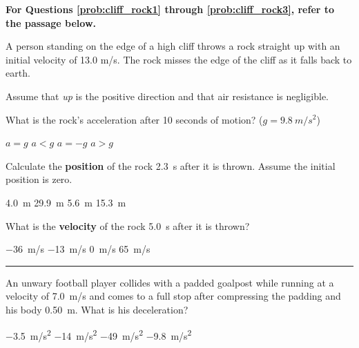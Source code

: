 \documentclass[addpoints]{exam}
\begin{document}
\begin{questions}
\clearpage
\begin{EnvUplevel}
\textbf{For Questions \ref{prob:cliff_rock1} through \ref{prob:cliff_rock3}, refer to the passage below.}

A person standing on the edge of a high cliff throws a rock straight up with an initial velocity of 13.0 m/s. The rock misses the edge of the cliff as it falls back to earth.

Assume that \textit{up} is the positive direction and that air resistance is negligible.
\end{EnvUplevel}%

\question \label{prob:cliff_rock1}
What is the rock's acceleration after 10 seconds of motion? ($g = \SI{9.8}{m/s^2}$)

\begin{choices}
\choice $a = g$
\choice $a < g$
\correctchoice $a = -g$
\choice $a > g$
\end{choices}

\question \label{prob:cliff_rock2}
Calculate the \textbf{position} of the rock \SI{2.3}{s} after it is thrown. Assume the initial position is zero.

\begin{choices}
\correctchoice \SI{4.0}{m}
\choice \SI{29.9}{m}
\choice \SI{5.6}{m}
\choice \SI{15.3}{m}
\end{choices}

\question \label{prob:cliff_rock3}
What is the \textbf{velocity} of the rock \SI{5.0}{s} after it is thrown?

\begin{choices}
\correctchoice \SI{-36}{m/s}
\choice \SI{-13}{m/s}
\choice \SI{0}{m/s}
\choice \SI{65}{m/s}
\end{choices}

\vspace{1em}
\hrule

\question %
An unwary football player collides with a padded goalpost while running at a velocity of \SI{7.0}{m/s} and comes to a full stop after compressing the padding and his body \SI{0.50}{m}. What is his deceleration?

\begin{choices}
\choice \SI{-3.5}{m/s^2}
\choice \SI{-14}{m/s^2}
\correctchoice \SI{-49}{m/s^2}
\choice \SI{-9.8}{m/s^2}
\end{choices}




\end{questions}
\end{document}
